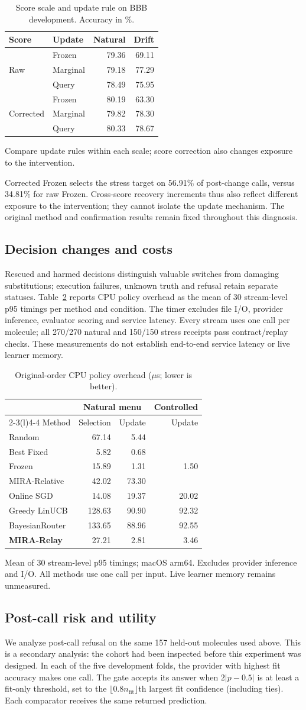 \documentclass[sigconf,anonymous]{aamas}
\makeatletter
\newcommand{\MiraTableFont}{\fontsize{9}{11}\selectfont}
\newcommand{\tnote}[1]{{\fontsize{8.5}{10}\selectfont\raggedright\par\vspace{3pt}#1\par}}
\newcommand{\notrun}{\textemdash}
\newcommand{\MiraCenterCaption}{Score scale and update rule on BBB development. Accuracy in \%.}
\newcommand{\MiraCenterLabels}{\label{tab:centering-diagnostic}}
\newcommand{\MiraCenterBody}{%
\begingroup\centering\MiraTableFont\setlength{\tabcolsep}{6pt}\renewcommand{\arraystretch}{1.08}
\begin{tabular}{@{}llrr@{}}
\toprule
Score & Update & Natural & Drift \\
\midrule
\multirow{3}{*}{Raw} & Frozen & 79.36 & 69.11 \\
& Marginal & 79.18 & 77.29 \\
& Query & 78.49 & 75.95 \\
\midrule
\multirow{3}{*}{Corrected} & Frozen & 80.19 & 63.30 \\
& Marginal & 79.82 & 78.30 \\
& Query & 80.33 & 78.67 \\
\bottomrule
\end{tabular}\par
\tnote{Compare update rules within each scale; score correction also changes exposure to the intervention.}
\endgroup}
\newcommand{\MiraCostCaption}{Original-order CPU policy overhead ($\mu$s; lower is better).}
\newcommand{\MiraCostLabels}{\label{tab:cost-validity}}
\newcommand{\MiraCostBody}{%
\begingroup\centering\MiraTableFont\setlength{\tabcolsep}{4pt}\renewcommand{\arraystretch}{1.08}
\begin{tabular}{@{}lrrr@{}}
\toprule
& \multicolumn{2}{c}{Natural menu} & Controlled \\
\cmidrule(lr){2-3}\cmidrule(l){4-4}
Method & Selection & Update & Update \\
\midrule
Random & 67.14 & 5.44 & \notrun \\
Best Fixed & 5.82 & 0.68 & \notrun \\
Frozen & 15.89 & 1.31 & 1.50 \\
MIRA-Relative & 42.02 & 73.30 & \notrun \\
\midrule
Online SGD & 14.08 & 19.37 & 20.02 \\
Greedy LinUCB & 128.63 & 90.90 & 92.32 \\
BayesianRouter & 133.65 & 88.96 & 92.55 \\
\midrule
\textbf{MIRA-Relay} & 27.21 & 2.81 & 3.46 \\
\bottomrule
\end{tabular}\par
\tnote{Mean of 30 stream-level p95 timings; macOS arm64. Excludes provider inference and I/O. All methods use one call per input. Live learner memory remains unmeasured.}
\endgroup}
\makeatother
\begin{document}
\begin{table}[t]
\caption{\MiraCenterCaption}
\MiraCenterLabels
\MiraCenterBody
\end{table}

Corrected Frozen selects the stress target on 56.91\% of post-change calls, versus 34.81\% for raw Frozen. Cross-score recovery increments thus also reflect different exposure to the intervention; they cannot isolate the update mechanism. The original method and confirmation results remain fixed throughout this diagnosis.


\subsection{Decision changes and costs}
Rescued and harmed decisions distinguish valuable switches from damaging substitutions; execution failures, unknown truth and refusal retain separate statuses. Table~\ref{tab:cost-validity} reports CPU policy overhead as the mean of 30 stream-level p95 timings per method and condition. The timer excludes file I/O, provider inference, evaluator scoring and service latency. Every stream uses one call per molecule; all 270/270 natural and 150/150 stress receipts pass contract/replay checks. These measurements do not establish end-to-end service latency or live learner memory.

\begin{table}[t]
\caption{\MiraCostCaption}
\MiraCostLabels
\MiraCostBody
\end{table}

\subsection{Post-call risk and utility}
We analyze post-call refusal on the same 157 held-out molecules used above. This is a secondary analysis: the cohort had been inspected before this experiment was designed. In each of the five development folds, the provider with highest fit accuracy makes one call. The gate accepts its answer when $2|p-0.5|$ is at least a fit-only threshold, set to the $\lfloor0.8n_{\mathrm{fit}}\rfloor$th largest fit confidence (including ties). Each comparator receives the same returned prediction.
\end{document}

